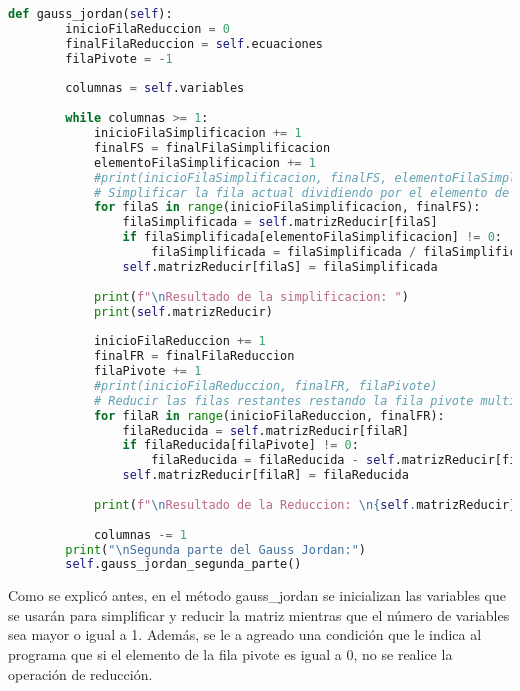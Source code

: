 \documentclass[letterpaper,12pt]{article}
\begin{document}
\begin{lstlisting}[style=jupyter, language=Python, caption={Método para resolver el sistema de ecuaciones}]
    def gauss_jordan(self):
        inicioFilaReduccion = 0
        finalFilaReduccion = self.ecuaciones
        filaPivote = -1
        
        columnas = self.variables
        
        while columnas >= 1:
            inicioFilaSimplificacion += 1
            finalFS = finalFilaSimplificacion
            elementoFilaSimplificacion += 1
            #print(inicioFilaSimplificacion, finalFS, elementoFilaSimplificacion)
            # Simplificar la fila actual dividiendo por el elemento de la columna correspondiente
            for filaS in range(inicioFilaSimplificacion, finalFS):
                filaSimplificada = self.matrizReducir[filaS]
                if filaSimplificada[elementoFilaSimplificacion] != 0:
                    filaSimplificada = filaSimplificada / filaSimplificada[elementoFilaSimplificacion]
                self.matrizReducir[filaS] = filaSimplificada
        
            print(f"\nResultado de la simplificacion: ")
            print(self.matrizReducir)
        
            inicioFilaReduccion += 1
            finalFR = finalFilaReduccion
            filaPivote += 1
            #print(inicioFilaReduccion, finalFR, filaPivote)
            # Reducir las filas restantes restando la fila pivote multiplicada por el elemento correspondiente
            for filaR in range(inicioFilaReduccion, finalFR):
                filaReducida = self.matrizReducir[filaR]
                if filaReducida[filaPivote] != 0:
                    filaReducida = filaReducida - self.matrizReducir[filaPivote]
                self.matrizReducir[filaR] = filaReducida
        
            print(f"\nResultado de la Reduccion: \n{self.matrizReducir}")
        
            columnas -= 1
        print("\nSegunda parte del Gauss Jordan:")
        self.gauss_jordan_segunda_parte()

\end{lstlisting}
Como se explicó antes, en el método \textcolor{jl_keyword}{gauss\_jordan} se inicializan las variables que se usarán para simplificar y reducir la matriz mientras que el número de variables sea mayor o igual a 1.
Además, se le a agreado una condición que le indica al programa que si el elemento de la fila pivote es igual a 0, no se realice la operación de reducción.
\end{document}
